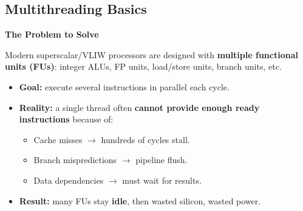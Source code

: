 \subsection{Multithreading Basics}

\begin{flushleft}
    \textcolor{Red2}{ \textbf{The Problem to Solve}}
\end{flushleft}
Modern superscalar/VLIW processors are designed with \textbf{multiple functional units (FUs)}: integer ALUs, FP units, load/store units, branch units, etc.
\begin{itemize}
    \item[\textcolor{Green3}{\faIcon{bullseye}}] \textcolor{Green3}{\textbf{Goal:}} execute several instructions in parallel each cycle.
    \item[\textcolor{Red2}{\faIcon{exclamation-triangle}}] \textcolor{Red2}{\textbf{Reality:}} a single thread often \textbf{cannot provide enough ready instructions} because of:
    \begin{itemize}
        \item Cache misses $\rightarrow$ hundreds of cycles stall.
        \item Branch mispredictions $\rightarrow$ pipeline flush.
        \item Data dependencies $\rightarrow$ must wait for results.
    \end{itemize}
    \item[\textcolor{Red2}{\faIcon{thumbs-down}}] \textcolor{Red2}{\textbf{Result:}} many FUs stay \textbf{idle}, then wasted silicon, wasted power.
\end{itemize}


